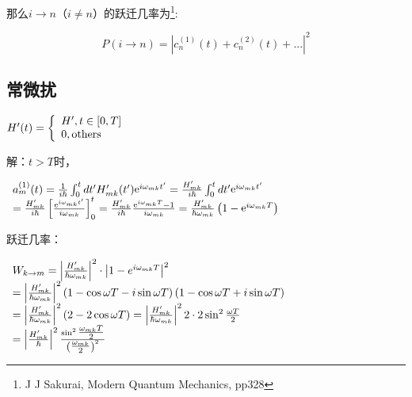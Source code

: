 那么$ i \to n$（$i \ne n$）的跃迁几率为\footnote{J J Sakurai, Modern
Quantum Mechanics, pp328}:


\begin{equation*}
P(i \to n)=|c_n^{(1)}(t) + c_n^{(2)}(t) + ... |^2
\end{equation*}


\subsection{常微扰}

\begin{center}
$H'(t) = \left\{ \begin{array}{l}
 H',t \in \left[ {0,T} \right] \\
 0,{\rm{others}} \\
 \end{array} \right.$
\end{center}


解：$t > T$时，

$\begin{array}{l}
 a_m^{(1)} (t) = \frac{1}{{i\hbar }}\int_0^t {dt'H'_{mk} (t'){\mathop{\rm e}\nolimits} ^{i\omega _{mk} t'} }  = \frac{{H'_{mk} }}{{i\hbar }}\int_0^t {dt'{\mathop{\rm e}\nolimits} ^{i\omega _{mk} t'} }  \\
  = \frac{{H'_{mk} }}{{i\hbar }}\left[ {\frac{{{\mathop{\rm e}\nolimits} ^{i\omega _{mk} t'} }}{{i\omega _{mk} }}} \right]_0^t  = \frac{{H'_{mk} }}{{i\hbar }}\frac{{{\mathop{\rm e}\nolimits} ^{i\omega _{mk} T}  - 1}}{{i\omega _{mk} }} = \frac{{H'_{mk} }}{{\hbar \omega _{mk} }}\left( {1 - {\mathop{\rm e}\nolimits} ^{i\omega _{mk} T} } \right) \\
 \end{array}$

跃迁几率：

$\begin{array}{l}
 W_{k \to m}  = \left| {\frac{{H'_{mk} }}{{\hbar \omega _{mk} }}} \right|^2  \cdot \left| {1 - e^{i\omega _{mk} T} } \right|^2   \\
 = \left| {\frac{{H'_{mk} }}{{\hbar \omega _{mk} }}} \right|^2 \left( {1 - \cos \omega T - i\sin \omega T} \right)\left( {1 - \cos \omega T + i\sin \omega T} \right) \\
 = \left| {\frac{{H'_{mk} }}{{\hbar \omega _{mk} }}} \right|^2 \left( {2 - 2\cos \omega T} \right) = \left| {\frac{{H'_{mk} }}{{\hbar \omega _{mk} }}} \right|^2 2 \cdot 2\sin ^2 {\textstyle{{\omega T} \over 2}} \\
 = \left| {\frac{{H'_{mk} }}{\hbar }} \right|^2 \frac{{\sin ^2 {\textstyle{{\omega _{mk} T} \over 2}}}}{{\left( {{\textstyle{{\omega _{mk} } \over 2}}} \right)^2 }} \\
 \end{array}$

